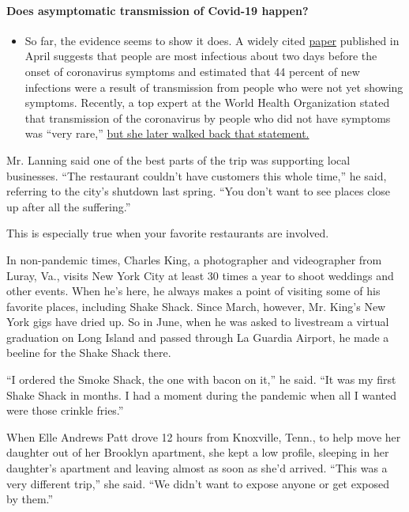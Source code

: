 \begin{itemize}
{  \paragraph{Does asymptomatic transmission of Covid-19
  happen?}\label{does-asymptomatic-transmission-of-covid-19-happen}}

  \begin{itemize}
  \tightlist
  \item
    So far, the evidence seems to show it does. A widely cited
    \href{https://www.nature.com/articles/s41591-020-0869-5}{paper}
    published in April suggests that people are most infectious about
    two days before the onset of coronavirus symptoms and estimated that
    44 percent of new infections were a result of transmission from
    people who were not yet showing symptoms. Recently, a top expert at
    the World Health Organization stated that transmission of the
    coronavirus by people who did not have symptoms was ``very rare,''
    \href{https://www.nytimes3xbfgragh.onion/2020/06/09/world/coronavirus-updates.html?action=click\&pgtype=Article\&state=default\&region=MAIN_CONTENT_3\&context=storylines_faq\#link-1f302e21}{but
    she later walked back that statement.}
  \end{itemize}
\end{itemize}

Mr. Lanning said one of the best parts of the trip was supporting local
businesses. ``The restaurant couldn't have customers this whole time,''
he said, referring to the city's shutdown last spring. ``You don't want
to see places close up after all the suffering.''

This is especially true when your favorite restaurants are involved.

In non-pandemic times, Charles King, a photographer and videographer
from Luray, Va., visits New York City at least 30 times a year to shoot
weddings and other events. When he's here, he always makes a point of
visiting some of his favorite places, including Shake Shack. Since
March, however, Mr. King's New York gigs have dried up. So in June, when
he was asked to livestream a virtual graduation on Long Island and
passed through La Guardia Airport, he made a beeline for the Shake Shack
there.

``I ordered the Smoke Shack, the one with bacon on it,'' he said. ``It
was my first Shake Shack in months. I had a moment during the pandemic
when all I wanted were those crinkle fries.''

When Elle Andrews Patt drove 12 hours from Knoxville, Tenn., to help
move her daughter out of her Brooklyn apartment, she kept a low profile,
sleeping in her daughter's apartment and leaving almost as soon as she'd
arrived. ``This was a very different trip,'' she said. ``We didn't want
to expose anyone or get exposed by them.''

